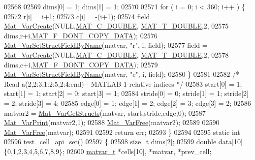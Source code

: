 \begin{DoxyCode}
{{{{{{{{02568 
02569     dims[0] = 1; dims[1] = 1;
02570 
02571     \textcolor{keywordflow}{for} ( i = 0; i < 360; i++ ) \{
02572         r[i] = i+1;
02573         c[i] = -(i+1);
02574         field = \hyperlink{group___m_a_t_ga1c54a84bb4d810c6fccdb8869489eac4}{Mat\_VarCreate}(NULL,\hyperlink{group___m_a_t_ggad4d60ae7b709fc81bfd744fb4c857c40a5d70e0862e5bdb7bd86bf7ba5948f307}{MAT\_C\_DOUBLE},
      \hyperlink{group___m_a_t_ggacf7b3b879282b7ab3a51190e49bf3453a31e721ecf7e188196f83c32838288797}{MAT\_T\_DOUBLE},2,
02575                               dims,r+i,\hyperlink{group___m_a_t_ggab9d6ef9e3ddca78a317b173f01d53fbba762244499f52eb35e7b53fb79a1f2889}{MAT\_F\_DONT\_COPY\_DATA});
02576         \hyperlink{group___m_a_t_ga702f2b853c605c94a8af50555fc7183b}{Mat\_VarSetStructFieldByName}(matvar, \textcolor{stringliteral}{"r"}, i, field);
02577         field = \hyperlink{group___m_a_t_ga1c54a84bb4d810c6fccdb8869489eac4}{Mat\_VarCreate}(NULL,\hyperlink{group___m_a_t_ggad4d60ae7b709fc81bfd744fb4c857c40a5d70e0862e5bdb7bd86bf7ba5948f307}{MAT\_C\_DOUBLE},
      \hyperlink{group___m_a_t_ggacf7b3b879282b7ab3a51190e49bf3453a31e721ecf7e188196f83c32838288797}{MAT\_T\_DOUBLE},2,
02578                               dims,c+i,\hyperlink{group___m_a_t_ggab9d6ef9e3ddca78a317b173f01d53fbba762244499f52eb35e7b53fb79a1f2889}{MAT\_F\_DONT\_COPY\_DATA});
02579         \hyperlink{group___m_a_t_ga702f2b853c605c94a8af50555fc7183b}{Mat\_VarSetStructFieldByName}(matvar, \textcolor{stringliteral}{"c"}, i, field);
02580     \}
02581 
02582     \textcolor{comment}{/* Read a(2,2:3,1:2:5,2:4:end) - MATLAB 1-relative indices */}
02583     start[0]  = 1; start[1]  = 1; start[2]  = 0; start[3]  = 1;
02584     stride[0] = 0; stride[1] = 1; stride[2] = 2; stride[3] = 4;
02585     edge[0]   = 1; edge[1]   = 2; edge[2]   = 3; edge[3]   = 2;
02586     matvar2 = \hyperlink{group___m_a_t_ga509178d7dc15faf9f7cd0440df6009b9}{Mat\_VarGetStructs}(matvar, start,stride,edge,0);
02587     \hyperlink{group___m_a_t_ga9100c145e338b84b55d5d0795d5d390a}{Mat\_VarPrint}(matvar2,1);
02588     \hyperlink{group___m_a_t_ga1d14716f7450530fd1c9d02413787f0e}{Mat\_VarFree}(matvar2);
02589 
02590     \hyperlink{group___m_a_t_ga1d14716f7450530fd1c9d02413787f0e}{Mat\_VarFree}(matvar);
02591 
02592     \textcolor{keywordflow}{return} err;
02593 \}
02594 
02595 \textcolor{keyword}{static} \textcolor{keywordtype}{int}
02596 test\_cell\_api\_set()
02597 \{
02598     \textcolor{keywordtype}{size\_t} dims[2];
02599     \textcolor{keywordtype}{double}    data[10] = \{0,1,2,3,4,5,6,7,8,9\};
02600     \hyperlink{group___m_a_t_structmatvar__t}{matvar\_t} *cells[10], *matvar, *prev\_cell;
}}}}}}}}
\end{DoxyCode}
